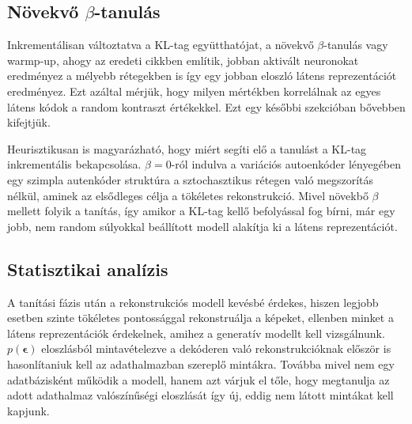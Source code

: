 \documentclass[12pt, english]{article}
\begin{document}
\vspace{5mm}

\subsection{Növekvő $\beta$-tanulás}

\vspace{5mm}

\par Inkrementálisan változtatva a KL-tag együtthatójat, a növekvő $\beta$-tanulás vagy warmp-up, ahogy az eredeti cikkben \cite{sonderby2016ladder} említik, jobban aktivált neuronokat eredményez a mélyebb rétegekben is így egy jobban eloszló látens reprezentációt eredményez. Ezt azáltal mérjük, hogy milyen mértékben korrelálnak az egyes látens kódok a random kontraszt értékekkel. Ezt egy későbbi szekcióban bővebben kifejtjük.

\vspace{4mm}

\par Heurisztikusan is magyarázható, hogy miért segíti elő a tanulást a KL-tag inkrementális bekapcsolása. $\beta = 0$-ról indulva a variációs autoenkóder lényegében egy szimpla autenkóder struktúra a sztochasztikus rétegen való megszorítás nélkül, aminek az elsődleges célja a tökéletes rekonstrukció. Mivel növekbő $\beta$ mellett folyik a tanítás, így amikor a KL-tag kellő befolyással fog bírni, már egy jobb, nem random súlyokkal beállított modell alakítja ki a látens reprezentációt.  

\vspace{5mm}

\subsection{Statisztikai analízis}

\vspace{5mm}

\par A tanítási fázis után a rekonstrukciós modell kevésbé érdekes, hiszen legjobb esetben szinte tökéletes pontossággal rekonstruálja a képeket, ellenben minket a látens reprezentációk érdekelnek, amihez a generatív modellt kell vizsgálnunk. $p(\bm{\epsilon})$ eloszlásból mintavételezve a dekóderen való rekonstrukcióknak először is hasonlítaniuk kell az adathalmazban szereplő mintákra. Továbba mivel nem egy adatbázisként működik a modell, hanem azt várjuk el tőle, hogy megtanulja az adott adathalmaz valószínűségi eloszlását így új, eddig nem látott mintákat kell kapjunk.
\end{document}
